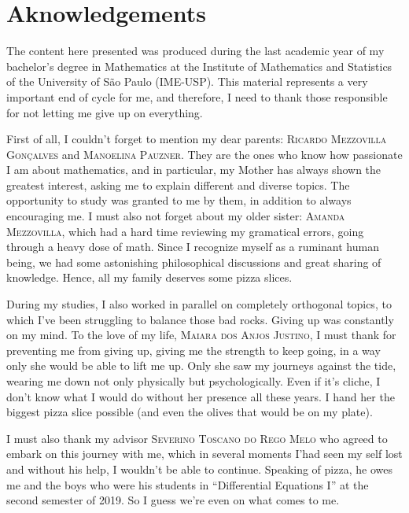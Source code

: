 \thispagestyle{empty}
\chapter*{Aknowledgements}

The content here presented was produced during the last academic year of my bachelor's degree in Mathematics at the Institute of Mathematics and Statistics of the University of São Paulo (IME-USP). This material represents a very important end of cycle for me, and therefore, I need to thank those responsible for not letting me give up on everything.

First of all, I couldn't forget to mention my dear parents: \textsc{Ricardo Mezzovilla Gonçalves} and \textsc{Manoelina Pauzner}. They are the ones who know how passionate I am about mathematics, and in particular, my Mother has always shown the greatest interest, asking me to explain different and diverse topics. The opportunity to study was granted to me by them, in addition to always encouraging me. I must also not forget about my older sister: \textsc{Amanda Mezzovilla}, which had a hard time reviewing my gramatical errors, going through a heavy dose of math. Since I recognize myself as a ruminant human being, we had some astonishing philosophical discussions and great sharing of knowledge. Hence, all my family deserves some pizza slices.

During my studies, I also worked in parallel on completely orthogonal topics, to which I've been struggling to balance those bad rocks. Giving up was constantly on my mind. To the love of my life, \textsc{Maiara dos Anjos Justino}, I must thank for preventing me from giving up, giving me the strength to keep going, in a way only she would be able to lift me up. Only she saw my journeys against the tide, wearing me down not only physically but psychologically. Even if it's cliche, I don't know what I would do without her presence all these years. I hand her the biggest pizza slice possible (and even the olives that would be on my plate).

I must also thank my advisor \textsc{Severino Toscano do Rego Melo} who agreed to embark on this journey with me, which in several moments I'had seen my self lost and without his help, I wouldn't be able to continue. Speaking of pizza, he owes me and the boys who were his students in ``Differential Equations I'' at the second semester of 2019. So I guess we're even on what comes to me.

